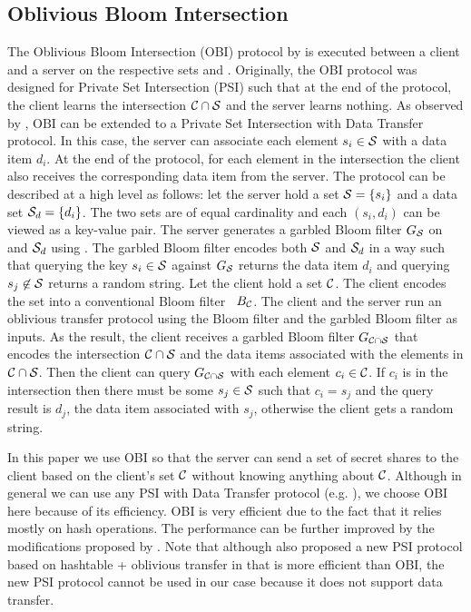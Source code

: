 \subsection{Oblivious Bloom Intersection}\label{sec:obi}
The Oblivious Bloom Intersection (OBI) protocol by \citet{DongCW13} is executed between a client and a server on the respective sets \cC and \cS. 
Originally, the OBI protocol was designed for Private Set Intersection (PSI) such that at the end of the protocol, the client learns the intersection $\mathcal{C}\cap \mathcal{S}$ and the server learns nothing. 
As observed by \citet{WenD14}, OBI can be extended to a Private Set Intersection with Data Transfer protocol. In this case, the server can associate each element $s_i\in\mathcal{S}$ with a data item $d_i$. 
At the end of the protocol, for each element in the intersection the client also receives the corresponding data item from the server. 
The protocol can be described at a high level as follows: let the server hold a set $\mathcal{S}=\{s_i\}$ and a data set $\mathcal{S}_d=\{d_{i}\}$. The two sets are of equal cardinality and each $(s_i,d_i)$ can be viewed as a key-value pair. The server generates a garbled Bloom filter $G_\mathcal{S}$ on \cS and $\mathcal{S}_d$ using \citet[Algorithm 1]{WenD14}. 
The garbled Bloom filter encodes both $\mathcal{S}$ and $\mathcal{S}_d$ in a way such that querying the key $s_i\in\mathcal{S}$ against $G_\mathcal{S}$ returns the data item $d_i$ and querying $s_j\not \in \mathcal{S}$ returns a random string. Let the client hold a set $\mathcal{C}$. The client encodes the set into a conventional Bloom filter~\cite{blo70} $B_\mathcal{C}$. 
The client and the server run an oblivious transfer protocol using the Bloom filter and the garbled Bloom filter as inputs. 
As the result, the client receives a garbled Bloom filter $G_{\mathcal{C}\cap\mathcal{S}}$ that encodes the intersection $\mathcal{C}\cap \mathcal{S}$ and the data items associated with the elements in $\mathcal{C}\cap \mathcal{S}$. Then the client can query $G_{\mathcal{C}\cap\mathcal{S}}$ with each element $c_i\in\mathcal{C}$. If $c_i$ is in the intersection then there must be  some $s_j\in \mathcal{S}$ such that $c_i=s_j$ and the query result is $d_j$, the data item associated with $s_j$, otherwise the client gets a random string. 

In this paper we use OBI so that the server can send a set of secret shares to the client based on the client's set $\mathcal{C}$ without knowing anything about $\mathcal{C}$. Although in general we can use any PSI with Data Transfer protocol (e.g. \citet{fre04}), we choose OBI here because of its efficiency. OBI is very efficient due to the fact that it relies mostly on hash operations. 
The performance can be further improved by the modifications proposed by \citet{Pinkas0Z14}. 
Note that although \citet{Pinkas0Z14} also proposed a new PSI protocol based on hashtable + oblivious transfer in \cite{Pinkas0Z14} that is more efficient than OBI, the new PSI protocol cannot be used in our case because it does not support data transfer.


